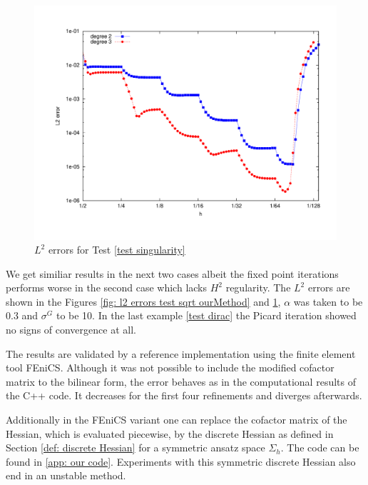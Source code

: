   
  \begin{figure}[H]
  	\centering
  	\includegraphics[scale =0.37]{plots/MA2.pdf}
  	\caption{$L^2$ errors for Test \ref{test singularity}}
  	\label{fig: l2 errors test singularity ourMethod}
  \end{figure}
We get similiar results in the next two cases albeit the fixed point iterations performs worse in the second case which lacks $H^2$ regularity. The $L^2$ errors are shown in the Figures \ref{fig: l2 errors test sqrt ourMethod} and \ref{fig: l2 errors test singularity ourMethod}, $\alpha$ was taken to be 0.3 and $\sigma^G$ to be 10. In the last example \ref{test dirac} the Picard iteration showed no signs of convergence at all.

The results are validated by a reference implementation using the finite element tool FEniCS. Although it was not possible to include the modified cofactor matrix to the bilinear form, the error behaves as in the computational results of the C++ code. It decreases for the first four refinements and diverges afterwards. 

Additionally in the FEniCS variant one can replace the cofactor matrix of the Hessian, which is evaluated piecewise, by the discrete Hessian as defined in Section \ref{def: discrete Hessian} for a symmetric ansatz space $\Sigma_h$. The code can be found in \ref{app: our code}. Experiments with this symmetric discrete Hessian also end in an unstable method.
